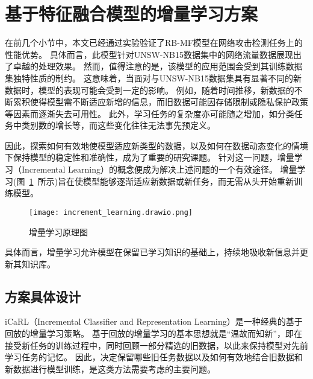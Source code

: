 \section{基于特征融合模型的增量学习方案}
在前几个小节中，本文已经通过实验验证了RB-MF模型在网络攻击检测任务上的性能优势。
具体而言，此模型针对UNSW-NB15数据集中的网络流量数据展现出了卓越的处理效果。
然而，值得注意的是，该模型的应用范围会受到其训练数据集独特性质的制约。
这意味着，当面对与UNSW-NB15数据集具有显著不同的新数据时，模型的表现可能会受到一定的影响。
例如，随着时间推移，新数据的不断累积使得模型需不断适应新增的信息，而旧数据可能因存储限制或隐私保护政策等因素而逐渐失去可用性。
此外，学习任务的复杂度亦可能随之增加，如分类任务中类别数的增长等，而这些变化往往无法事先预定义。\par

因此，探索如何有效地使模型适应新类型的数据，以及如何在数据动态变化的情境下保持模型的稳定性和准确性，成为了重要的研究课题。
针对这一问题，增量学习（Incremental Learning）的概念便成为解决上述问题的一个有效途径。
增量学习(图~\ref{fig:incremental_learning}~所示)旨在使模型能够逐渐适应新数据或新任务，而无需从头开始重新训练模型。
\begin{figure}[htbp]
	\centering
	\texttt{[image: increment\_learning.drawio.png]}
	\caption{增量学习原理图}
	\label{fig:incremental_learning}
\end{figure}
具体而言，增量学习允许模型在保留已学习知识的基础上，持续地吸收新信息并更新其知识库。

\subsection{方案具体设计}
iCaRL（Incremental Classifier and Representation Learning）\cite{rebuffi2017icarl}是一种经典的基于回放的增量学习策略。
基于回放的增量学习的基本思想就是“温故而知新”，即在接受新任务的训练过程中，同时回顾一部分精选的旧数据，以此来保持模型对先前学习任务的记忆。
因此，决定保留哪些旧任务数据以及如何有效地结合旧数据和新数据进行模型训练，是这类方法需要考虑的主要问题。\par

